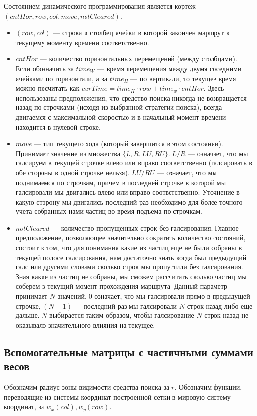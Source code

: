 Состоянием динамического программирования является кортеж $(cntHor, row, col, move, notCleared)$.
\begin{itemize}
\item $(row, col)$ --- строка и столбец ячейки в которой закончен маршрут к текущему моменту времени
соответственно.
\item $cntHor$ --- количество горизонтальных перемещений (между столбцами). Если обозначить
за $time_W$ --- время перемещения между двумя соседними ячейками по горизонтали, а за $time_H$ ---
по вертикали, то текущее время можно посчитать как $curTime = time_H \cdot row + time_w \cdot cntHor$.
Здесь использованы предположения, что средство поиска никогда не возвращается назад по строчками
(исходя из выбранной стратегии поиска), всегда двигаемся с максимальной скоростью и в начальный
момент времени находится в нулевой строке.
\item $move$ --- тип текущего хода (который завершится в этом состоянии). Принимает значение 
из множества $\{L, R, LU, RU\}$. $L/R$ --- означает, что мы галсируем в текущей строчке влево или
вправо соответственно (галсировать  в обе стороны в одной строчке нельзя). 
$LU/RU$ --- означает, что мы поднимаемся по строчкам, причем в последней строчке в которой мы
галсировали мы двигались влево или вправо соответственно. Уточнение в какую сторону мы двигались
последний раз необходимо для более точного учета собранных нами частиц во время подъема по строчкам.
\item $notCleared$ --- количество пропущенных строк без галсирования. Главное предположение,
позволяющее значительно сократить количество состояний, состоит в том, что для понимания
какие из частиц еще не были собраны в текущей полосе галсирования,
нам достаточно знать когда был предыдущий галс или другими словами сколько строк мы пропустили без
галсирования. Зная какие из частиц не собраны, мы сможем рассчитать сколько частиц мы соберем
в текущий момент прохождения маршрута. Данный параметр принимает $N$ значений. $0$ означает,
что мы галсировали прямо в предыдущей строчке, $(N-1)$ --- последний раз мы галсировали $N$ строк
назад либо еще дальше. $N$ выбирается таким образом, чтобы галсирование $N$ строк назад
не оказывало значительного влияния на текущее.
\end{itemize}

\subsection{Вспомогательные матрицы с частичными суммами весов}
Oбозначим радиус зоны видимости средства поиска за $r$. Обозначим функции, переводящие
из системы координат построенной сетки в мировую систему координат, за $w_x(col), w_y(row)$.


